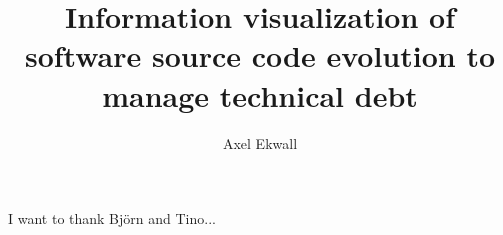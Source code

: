 \documentclass[sigchi, nonacm]{acmart}
\begin{document}
\title{Information visualization of software source code evolution to manage technical debt}

\author{Axel Ekwall}




\maketitle









\begin{acks}
I want to thank Björn and Tino...
\end{acks}




\appendix
\end{document}
